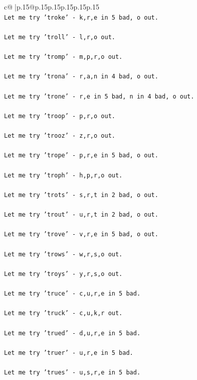 \documentclass{article}
\begin{document}
{\begin{supertabular}{c@{$\;$}|p{.15\linewidth}@{}p{.15\linewidth}p{.15\linewidth}p{.15\linewidth}p{.15\linewidth}p{.15\linewidth}}
{{{\\ 
\texttt{Let me try 'troke' {-} k,r,e in 5 bad, o out. } \\
\\ 
\texttt{Let me try 'troll' {-} l,r,o out. } \\
\\ 
\texttt{Let me try 'tromp' {-} m,p,r,o out. } \\
\\ 
\texttt{Let me try 'trona' {-} r,a,n in 4 bad, o out. } \\
\\ 
\texttt{Let me try 'trone' {-} r,e in 5 bad, n in 4 bad, o out. } \\
\\ 
\texttt{Let me try 'troop' {-} p,r,o out. } \\
\\ 
\texttt{Let me try 'trooz' {-} z,r,o out. } \\
\\ 
\texttt{Let me try 'trope' {-} p,r,e in 5 bad, o out. } \\
\\ 
\texttt{Let me try 'troph' {-} h,p,r,o out. } \\
\\ 
\texttt{Let me try 'trots' {-} s,r,t in 2 bad, o out. } \\
\\ 
\texttt{Let me try 'trout' {-} u,r,t in 2 bad, o out. } \\
\\ 
\texttt{Let me try 'trove' {-} v,r,e in 5 bad, o out. } \\
\\ 
\texttt{Let me try 'trows' {-} w,r,s,o out. } \\
\\ 
\texttt{Let me try 'troys' {-} y,r,s,o out. } \\
\\ 
\texttt{Let me try 'truce' {-} c,u,r,e in 5 bad. } \\
\\ 
\texttt{Let me try 'truck' {-} c,u,k,r out. } \\
\\ 
\texttt{Let me try 'trued' {-} d,u,r,e in 5 bad. } \\
\\ 
\texttt{Let me try 'truer' {-} u,r,e in 5 bad. } \\
\\ 
\texttt{Let me try 'trues' {-} u,s,r,e in 5 bad. } \\
}}}
\end{supertabular}}
\end{document}
